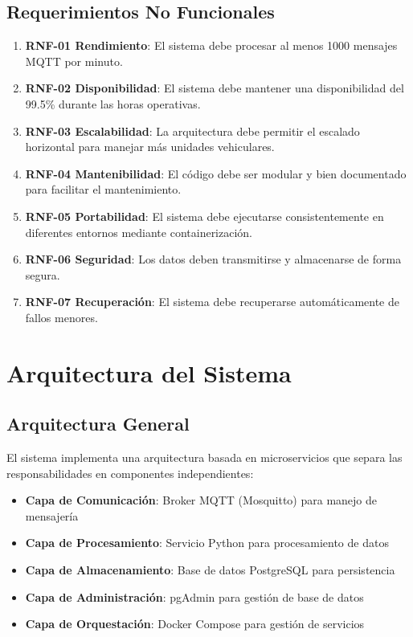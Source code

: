 \subsection{Requerimientos No Funcionales}

\begin{enumerate}[noitemsep]
    \item \textbf{RNF-01 Rendimiento}: El sistema debe procesar al menos 1000 mensajes MQTT por minuto.
    
    \item \textbf{RNF-02 Disponibilidad}: El sistema debe mantener una disponibilidad del 99.5\% durante las horas operativas.
    
    \item \textbf{RNF-03 Escalabilidad}: La arquitectura debe permitir el escalado horizontal para manejar más unidades vehiculares.
    
    \item \textbf{RNF-04 Mantenibilidad}: El código debe ser modular y bien documentado para facilitar el mantenimiento.
    
    \item \textbf{RNF-05 Portabilidad}: El sistema debe ejecutarse consistentemente en diferentes entornos mediante containerización.
    
    \item \textbf{RNF-06 Seguridad}: Los datos deben transmitirse y almacenarse de forma segura.
    
    \item \textbf{RNF-07 Recuperación}: El sistema debe recuperarse automáticamente de fallos menores.
\end{enumerate}

\section{Arquitectura del Sistema}

\subsection{Arquitectura General}

El sistema implementa una arquitectura basada en microservicios que separa las responsabilidades en componentes independientes:

\begin{itemize}[noitemsep]
    \item \textbf{Capa de Comunicación}: Broker MQTT (Mosquitto) para manejo de mensajería
    \item \textbf{Capa de Procesamiento}: Servicio Python para procesamiento de datos
    \item \textbf{Capa de Almacenamiento}: Base de datos PostgreSQL para persistencia
    \item \textbf{Capa de Administración}: pgAdmin para gestión de base de datos
    \item \textbf{Capa de Orquestación}: Docker Compose para gestión de servicios
\end{itemize}

